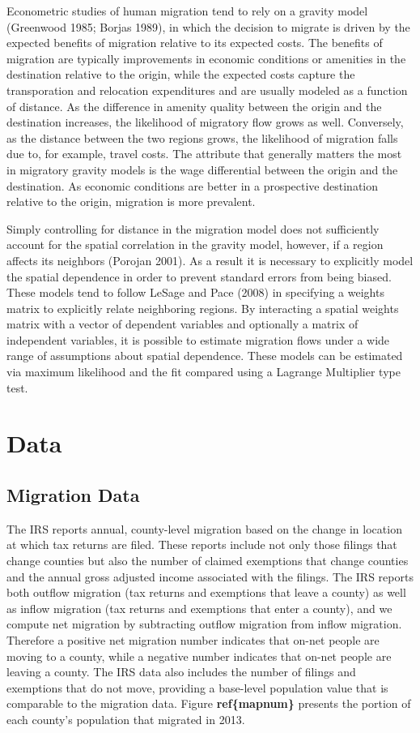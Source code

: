 \documentclass[]{article}
\begin{document}
Econometric studies of human migration tend to rely on a gravity model
(Greenwood 1985; Borjas 1989), in which the decision to migrate is
driven by the expected benefits of migration relative to its expected
costs. The benefits of migration are typically improvements in economic
conditions or amenities in the destination relative to the origin, while
the expected costs capture the transporation and relocation expenditures
and are usually modeled as a function of distance. As the difference in
amenity quality between the origin and the destination increases, the
likelihood of migratory flow grows as well. Conversely, as the distance
between the two regions grows, the likelihood of migration falls due to,
for example, travel costs. The attribute that generally matters the most
in migratory gravity models is the wage differential between the origin
and the destination. As economic conditions are better in a prospective
destination relative to the origin, migration is more prevalent.

Simply controlling for distance in the migration model does not
sufficiently account for the spatial correlation in the gravity model,
however, if a region affects its neighbors (Porojan 2001). As a result
it is necessary to explicitly model the spatial dependence in order to
prevent standard errors from being biased. These models tend to follow
LeSage and Pace (2008) in specifying a weights matrix to explicitly
relate neighboring regions. By interacting a spatial weights matrix with
a vector of dependent variables and optionally a matrix of independent
variables, it is possible to estimate migration flows under a wide range
of assumptions about spatial dependence. These models can be estimated
via maximum likelihood and the fit compared using a Lagrange Multiplier
type test.

\section{Data}\label{data}

\subsection{Migration Data}\label{migration-data}

The IRS reports annual, county-level migration based on the change in
location at which tax returns are filed. These reports include not only
those filings that change counties but also the number of claimed
exemptions that change counties and the annual gross adjusted income
associated with the filings. The IRS reports both outflow migration (tax
returns and exemptions that leave a county) as well as inflow migration
(tax returns and exemptions that enter a county), and we compute net
migration by subtracting outflow migration from inflow migration.
Therefore a positive net migration number indicates that on-net people
are moving to a county, while a negative number indicates that on-net
people are leaving a county. The IRS data also includes the number of
filings and exemptions that do not move, providing a base-level
population value that is comparable to the migration data. Figure
\textbf{ref\{mapnum\}} presents the portion of each county's population
that migrated in 2013.
\end{document}
